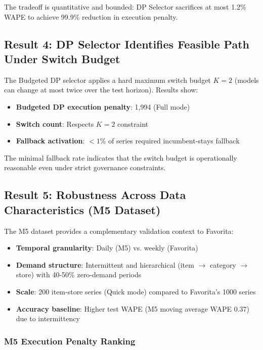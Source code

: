 The tradeoff is quantitative and bounded: DP Selector sacrifices at most 1.2\% WAPE to achieve 99.9\% reduction in execution penalty.

\subsection{Result 4: DP Selector Identifies Feasible Path Under Switch Budget}

The Budgeted DP selector applies a hard maximum switch budget $K=2$ (models can change at most twice over the test horizon). Results show:

\begin{itemize}
    \item \textbf{Budgeted DP execution penalty}: 1,994 (Full mode)
    \item \textbf{Switch count}: Respects $K=2$ constraint
    \item \textbf{Fallback activation}: $<1\%$ of series required incumbent-stays fallback
\end{itemize}

The minimal fallback rate indicates that the switch budget is operationally reasonable even under strict governance constraints.

\subsection{Result 5: Robustness Across Data Characteristics (M5 Dataset)}

The M5 dataset provides a complementary validation context to Favorita:
\begin{itemize}
    \item \textbf{Temporal granularity}: Daily (M5) vs. weekly (Favorita)
    \item \textbf{Demand structure}: Intermittent and hierarchical (item $\to$ category $\to$ store) with 40-50\% zero-demand periods
    \item \textbf{Scale}: 200 item-store series (Quick mode) compared to Favorita's 1000 series
    \item \textbf{Accuracy baseline}: Higher test WAPE (M5 moving average WAPE 0.37) due to intermittency
\end{itemize}

\subsubsection{M5 Execution Penalty Ranking}

